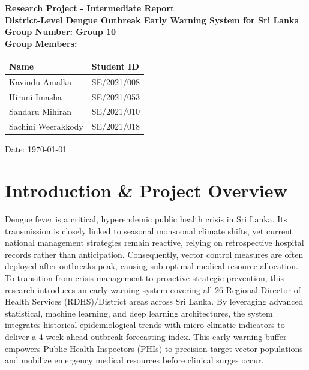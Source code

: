 \documentclass[12pt,a4paper]{article}
\begin{document}
\begin{titlepage}
    \centering
    \vspace*{1cm}
    {\Large \textbf{Research Project - Intermediate Report}}\\[1.5cm]

    {\huge \textbf{District-Level Dengue Outbreak Early Warning System for Sri Lanka}}\\[3cm]

    \textbf{Group Number: Group 10}\\[4.5cm]

    {\textbf{Group Members:}}\\[0.3cm]
    \begin{center}
        \begin{tabular}{|l|l|}
            \hline
            \textbf{Name}      & \textbf{Student ID} \\ \hline
            Kavindu Amalka     & SE/2021/008         \\ \hline
            Hiruni Imasha      & SE/2021/053         \\ \hline
            Sandaru Mihiran    & SE/2021/010         \\ \hline
            Sachini Weerakkody & SE/2021/018         \\ \hline
        \end{tabular}
    \end{center}

    \vfill
    Date: \today
\end{titlepage}

\tableofcontents
\newpage

\section{Introduction \& Project Overview}

Dengue fever is a critical, hyperendemic public health crisis in Sri Lanka. Its transmission is closely linked to seasonal monsoonal climate shifts, yet current national management strategies remain reactive, relying on retrospective hospital records rather than anticipation. Consequently, vector control measures are often deployed after outbreaks peak, causing sub-optimal medical resource allocation. To transition from crisis management to proactive strategic prevention, this research introduces an early warning system covering all 26 Regional Director of Health Services (RDHS)/District areas across Sri Lanka. By leveraging advanced statistical, machine learning, and deep learning architectures, the system integrates historical epidemiological trends with micro-climatic indicators to deliver a 4-week-ahead outbreak forecasting index. This early warning buffer empowers Public Health Inspectors (PHIs) to precision-target vector populations and mobilize emergency medical resources before clinical surges occur.
\end{document}
